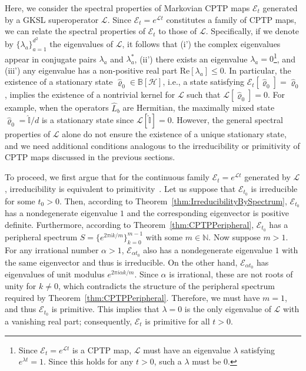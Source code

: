 \documentclass[preprint,pteplogo]{ptephy_v2}%
\numberwithin{equation}{section}
\theoremstyle{definition}
\newcommand{\mc}[1]{\mathcal{#1}}
\newcommand{\mbb}[1]{\mathbb{#1}}
\begin{document}
Here, we consider the spectral properties of Markovian CPTP maps $\mc{E}_t$ generated by a GKSL superoperator $\mc{L}$.
Since $\mc{E}_t = e^{\mc{L}t}$ constitutes a family of CPTP maps, we can relate the spectral properties of $\mc{E}_t$ to those of $\mc{L}$.
Specifically, if we denote by $\{ \lambda_a \}_{a=1}^{d^2}$ the eigenvalues of $\mc{L}$, it follows that (i') the complex eigenvalues appear in conjugate pairs $\lambda_a$ and $\lambda_a^*$, (ii') there exists an eigenvalue $\lambda_a =0$\footnote{
Since $\mc{E}_t = e^{\mc{L}t}$ is a CPTP map, $\mc{L}$ must have an eigenvalue $\lambda$ satisfying $e^{\lambda t}=1$.
Since this holds for any $t>0$, such a $\lambda$ must be $0$.
}, and (iii') any eigenvalue has a non-positive real part $\textrm{Re}[\lambda_a] \leq 0$.
In particular, the existence of a stationary state $\hat{\varrho}_0 \in \mbb{B}[\mc{H}]$, i.e., a state satisfying $\mc{E}_t[\hat{\varrho}_0] = \hat{\varrho}_0$, implies the existence of a nontrivial kernel for $\mc{L}$ such that $\mc{L}[\hat{\varrho}_0] = 0$.
For example, when the operators $\hat{L}_b$ are Hermitian, the maximally mixed state $\hat{\varrho}_0 = \hat{\mbb{I}}/d$ is a stationary state since $\mc{L}[\hat{\mbb{I}}]=0$.
However, the general spectral properties of $\mc{L}$ alone do not ensure the existence of a unique stationary state, and we need additional conditions analogous to the irreducibility or primitivity of CPTP maps discussed in the previous sections.

To proceed, we first argue that for the continuous family $\mc{E}_t = e^{\mc{L}t}$ generated by $\mathcal{L}$, irreducibility is equivalent to primitivity~\cite{wolf2012quantum}.
Let us suppose that $\mc{E}_{t_0}$ is irreducible for some $t_0>0$.
Then, according to Theorem~\ref{thm:IrreducibilityBySpectrum}, $\mc{E}_{t_0}$ has a nondegenerate eigenvalue $1$ and the corresponding eigenvector is positive definite.
Furthermore, according to Theorem~\ref{thm:CPTPPeripheral}, $\mc{E}_{t_0}$ has a peripheral spectrum $S = \{ e^{2\pi ik/m}  \}_{k=0}^{m-1}$ with some $m \in \mbb{N}$.
Now suppose $m>1$.
For any irrational number $\alpha>1$, $\mc{E}_{\alpha t_0}$ also has a nondegenerate eigenvalue $1$ with the same eigenvector and thus is irreducible.
On the other hand, $\mc{E}_{\alpha t_0}$ has eigenvalues of unit modulus $e^{2\pi i\alpha k/m}$.
Since $\alpha$ is irrational, these are not roots of unity for $k \neq 0$, which contradicts the structure of the peripheral spectrum required by Theorem~\ref{thm:CPTPPeripheral}.
Therefore, we must have $m=1$, and thus $\mc{E}_{t_0}$ is primitive.
This implies that $\lambda=0$ is the only eigenvalue of $\mc{L}$ with a vanishing real part; consequently, $\mc{E}_t$ is primitive for all $t>0$.
\end{document}
